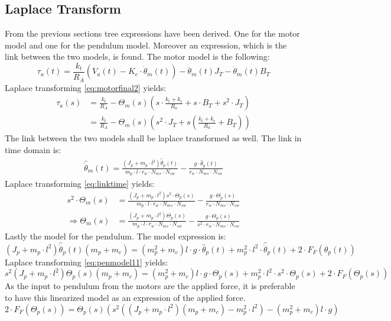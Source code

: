 \subsection{Laplace Transform}
From the previous sections tree expressions have been derived. One for the motor model and one for the pendulum model. Moreover an expression, which is the link between the two models, is found. 
The motor model is the following:
\begin{equation}
\tau_a(t) = \frac{k_t}{R_A} \left( V_a(t) - K_e \cdot \dot\theta_m(t) \right) - \ddot\theta_m(t)J_{T} - \dot\theta_m(t)B_{T}  \label{eq:motorfinal2}
\end{equation}
Laplace transforming \autoref{eq:motorfinal2} yields:
\begin{align}
\tau_a(s)&=\frac{k_t}{R_A}- \Theta_m(s) (s\cdot \frac{k_t+k_e}{R_a}+s\cdot B_T+s^2\cdot J_T)\\
&=\frac{k_t}{R_A}- \Theta_m(s)(s^2\cdot J_T+s(\frac{k_t+k_e}{R_a}+B_T))
\end{align}
The link between the two models shall be laplace transformed as well. The link in time domain is:
\begin{align}
 \hat{\ddot\theta}_m(t)=\frac{(J_p+m_p\cdot l^2)\hat{\ddot \theta}_p(t)}{m_p\cdot l\cdot r_w\cdot N_{ms}\cdot N_{sw}}-\frac{g\cdot \hat{\theta}_p(t)}{r_w\cdot N_{ms}\cdot N_{sw}}\label{eq:linktime}
\end{align}
Laplace transforming \autoref{eq:linktime} yields:
\begin{align}
s^2\cdot \Theta_m(s)&= \frac{(J_p+m_p\cdot l^2)s^2\cdot \Theta_p(s)}{m_p\cdot l \cdot r_w \cdot N_{ms}\cdot N_{sw}}-\frac{g\cdot \Theta_p(s)}{r_w\cdot N_{ms}\cdot N_{sw}}\\
\Rightarrow \Theta_m(s)&= \frac{(J_p+m_p\cdot l^2)\Theta_p(s)}{m_p\cdot l \cdot r_w \cdot N_{ms}\cdot N_{sw}}-\frac{g\cdot \Theta_p(s)}{s^2 \cdot r_w\cdot N_{ms}\cdot N_{sw}}
\end{align}
Lastly the model for the pendulum. The model expression is: 
\begin{equation}
(J_p+m_p\cdot l^2)\hat{\ddot \theta}_p(t)(m_p+m_c)=(m_p^2+m_c)l\cdot g \cdot \hat{\theta}_p(t)+m_p^2\cdot l^2 \cdot  \hat{\ddot\theta}_p(t)+2\cdot F_F(\theta_p(t))\label{eq:penmodel11}
\end{equation}
Laplace transforming \autoref{eq:penmodel11} yields:
\begin{equation}
s^2(J_p+m_p\cdot l^2)\Theta_p(s)(m_p+m_c)=(m_p^2+m_c)l\cdot g \cdot \Theta_p(s) + m_p^2 \cdot l^2 \cdot s^2\cdot \Theta_p(s) +2\cdot F_F(\Theta_p(s))
\end{equation}
As the input to pendulum from the motors are the applied force, it is preferable to have this linearized model as an expression of the applied force. 
\begin{equation}
2\cdot F_F(\Theta_p(s))=\Theta_p(s)(s^2((J_p+m_p\cdot l^2)(m_p+m_c)-m_p^2\cdot l^2)-(m_p^2 + m_c)l\cdot g)
\end{equation}

